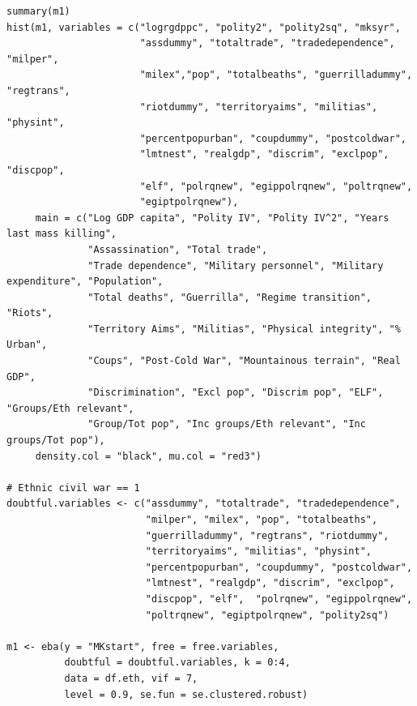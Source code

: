 \documentclass[a4paper,12pt]{article}
\begin{document}
\begin{verbatim}
summary(m1)
hist(m1, variables = c("logrgdppc", "polity2", "polity2sq", "mksyr",
                       "assdummy", "totaltrade", "tradedependence", "milper",
                       "milex","pop", "totalbeaths", "guerrilladummy", "regtrans",
                       "riotdummy", "territoryaims", "militias", "physint",
                       "percentpopurban", "coupdummy", "postcoldwar",
                       "lmtnest", "realgdp", "discrim", "exclpop", "discpop",
                       "elf", "polrqnew", "egippolrqnew", "poltrqnew",
                       "egiptpolrqnew"),
     main = c("Log GDP capita", "Polity IV", "Polity IV^2", "Years last mass killing",
              "Assassination", "Total trade", 
              "Trade dependence", "Military personnel", "Military expenditure", "Population", 
              "Total deaths", "Guerrilla", "Regime transition", "Riots",
              "Territory Aims", "Militias", "Physical integrity", "% Urban",
              "Coups", "Post-Cold War", "Mountainous terrain", "Real GDP",
              "Discrimination", "Excl pop", "Discrim pop", "ELF", "Groups/Eth relevant", 
              "Group/Tot pop", "Inc groups/Eth relevant", "Inc groups/Tot pop"),
     density.col = "black", mu.col = "red3")
     
# Ethnic civil war == 1
doubtful.variables <- c("assdummy", "totaltrade", "tradedependence",
                        "milper", "milex", "pop", "totalbeaths",
                        "guerrilladummy", "regtrans", "riotdummy",
                        "territoryaims", "militias", "physint",
                        "percentpopurban", "coupdummy", "postcoldwar",
                        "lmtnest", "realgdp", "discrim", "exclpop", 
                        "discpop", "elf",  "polrqnew", "egippolrqnew",
                        "poltrqnew", "egiptpolrqnew", "polity2sq")

m1 <- eba(y = "MKstart", free = free.variables,
          doubtful = doubtful.variables, k = 0:4,
          data = df.eth, vif = 7,
          level = 0.9, se.fun = se.clustered.robust)
          

\end{verbatim}
\end{document}

